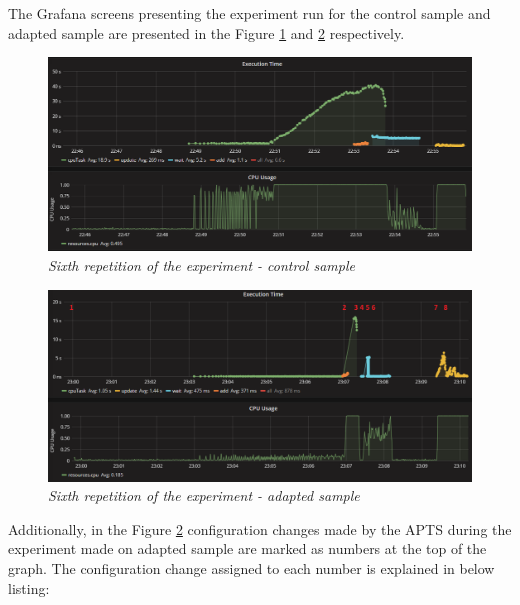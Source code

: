 \documentclass[12pt,a4paper]{article}
\begin{document}
The Grafana screens presenting the experiment run for the control sample and adapted sample are presented in the Figure \ref{figure:random:screen:control:6} and \ref{figure:random:screen:adapted:6} respectively. 

\begin{figure}[!htb]
\centering
\includegraphics[width=1\textwidth]{6-ctrl}
\caption{\textit{Sixth repetition of the experiment - control sample}} \label{figure:random:screen:control:6}
\end{figure}

\begin{figure}[!htb]
\centering
\includegraphics[width=1\textwidth]{6-adap}
\caption{\textit{Sixth repetition of the experiment - adapted sample}} \label{figure:random:screen:adapted:6}
\end{figure}

Additionally, in the Figure \ref{figure:random:screen:adapted:6} configuration changes made by the APTS during the experiment made on adapted sample are marked as numbers at the top of the graph. The configuration change assigned to each number is explained in below listing: 
\end{document}
